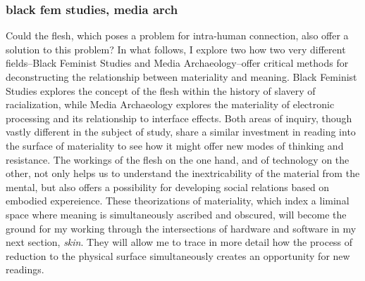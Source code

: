 \documentclass[11pt]{article}
\begin{document}
\subsubsection{black fem studies, media arch}
\label{sec:org8248270}
Could the flesh, which poses a problem for intra-human connection,
also offer a solution to this problem? In what follows, I explore two
how two very different fields--Black Feminist Studies and Media
Archaeology--offer critical methods for deconstructing the
relationship between materiality and meaning. Black Feminist Studies
explores the concept of the flesh within the history of slavery of
racialization, while Media Archaeology explores the materiality of
electronic processing and its relationship to interface effects. Both
areas of inquiry, though vastly different in the subject of study,
share a similar investment in reading into the surface of materiality
to see how it might offer new modes of thinking and resistance. The
workings of the flesh on the one hand, and of technology on the other,
not only helps us to understand the inextricability of the material
from the mental, but also offers a possibility for developing social
relations based on embodied expereience. These theorizations of
materiality, which index a liminal space where meaning is
simultaneously ascribed and obscured, will become the ground for my
working through the intersections of hardware and software in my next
section, \emph{skin}. They will allow me to trace in more detail how the
process of reduction to the physical surface simultaneously creates an
opportunity for new readings.
\end{document}
